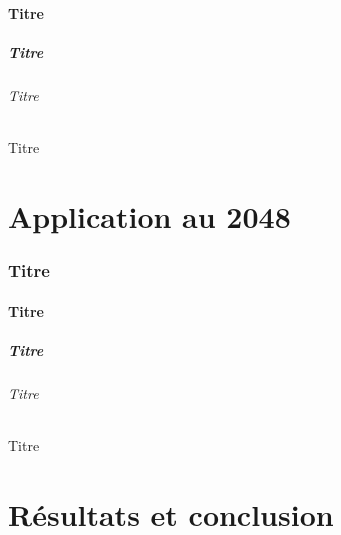 \documentclass[a4paper]{article}
\begin{document}
\section{}
\subsection{Titre}
\subsubsection{Titre}
\paragraph{Titre}
\subparagraph{Titre}

\part{Application au 2048}
\section{Titre}
\subsection{Titre}
\subsubsection{Titre}
\paragraph{Titre}
\subparagraph{Titre}

\part{Résultats et conclusion}







\end{document}
